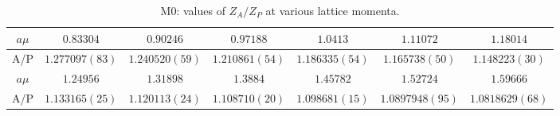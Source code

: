 \begin{table}[h!]
\begin{center}
\caption{M0: values of $Z_A/Z_P$ at various lattice momenta.}
\begin{tabular}{c|c c c c c c}
\hline
\hline
$a\mu$ & $0.83304$ & $0.90246$ & $0.97188$ & $1.0413$ & $1.11072$ & $1.18014$ \\
\hline
A/P & $1.277097(83)$ & $1.240520(59)$ & $1.210861(54)$ & $1.186335(54)$ & $1.165738(50)$ & $1.148223(30)$ \\
\hline
$a\mu$ & $1.24956$ & $1.31898$ & $1.3884$ & $1.45782$ & $1.52724$ & $1.59666$ \\
\hline
A/P & $1.133165(25)$ & $1.120113(24)$ & $1.108710(20)$ & $1.098681(15)$ & $1.0897948(95)$ & $1.0818629(68)$ \\
\hline
\hline
\end{tabular}
\end{center}
\end{table}